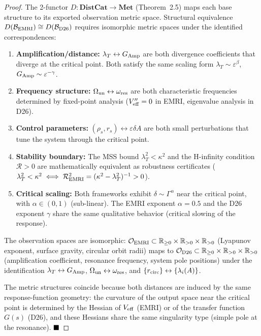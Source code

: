 \begin{proof}
The 2-functor $D: \mathbf{DistCat} \to \mathbf{Met}$ (Theorem~2.5) maps each base structure to its exported observation metric space. Structural equivalence $D(\mathcal{B}_{\rm EMRI}) \cong D(\mathcal{B}_{\rm D26})$ requires isomorphic metric spaces under the identified correspondences:
\begin{enumerate}
\item \textbf{Amplification/distance:} $\lambda_T \leftrightarrow G_{\rm Amp}$ are both divergence coefficients that diverge at the critical point. Both satisfy the same scaling form $\lambda_T \sim \varepsilon^\beta$, $G_{\rm Amp} \sim \varepsilon^{-\gamma}$.
\item \textbf{Frequency structure:} $\Omega_{\rm un} \leftrightarrow \omega_{\rm res}$ are both characteristic frequencies determined by fixed-point analysis ($V_{\rm eff}'' = 0$ in EMRI, eigenvalue analysis in D26).
\item \textbf{Control parameters:} $(\rho_s, r_s) \leftrightarrow \varepsilon\delta A$ are both small perturbations that tune the system through the critical point.
\item \textbf{Stability boundary:} The MSS bound $\lambda_T^2 < \kappa^2$ and the H-infinity condition $\mathcal{R} > 0$ are mathematically equivalent as robustness certificates ($\lambda_T^2 < \kappa^2 \iff \mathcal{R}_{\rm EMRI}^2 = (\kappa^2 - \lambda_T^2)^{-1} > 0$).
\item \textbf{Critical scaling:} Both frameworks exhibit $\delta \sim \Gamma^\alpha$ near the critical point, with $\alpha \in (0, 1)$ (sub-linear). The EMRI exponent $\alpha = 0.5$ and the D26 exponent $\gamma$ share the same qualitative behavior (critical slowing of the response).
\end{enumerate}

The observation spaces are isomorphic: $\mathcal{O}_{\rm EMRI} \subset \mathbb{R}_{\geq 0} \times \mathbb{R}_{>0} \times \mathbb{R}_{>0}$ (Lyapunov exponent, surface gravity, circular orbit radii) maps to $\mathcal{O}_{\rm D26} \subset \mathbb{R}_{\geq 0} \times \mathbb{R}_{>0} \times \mathbb{R}_{>0}$ (amplification coefficient, resonance frequency, system pole positions) under the identification $\lambda_T \leftrightarrow G_{\rm Amp}$, $\Omega_{\rm un} \leftrightarrow \omega_{\rm res}$, and $\{r_{\rm circ}\} \leftrightarrow \{\lambda_i(A)\}$.

The metric structures coincide because both distances are induced by the same response-function geometry: the curvature of the output space near the critical point is determined by the Hessian of $V_{\rm eff}$ (EMRI) or of the transfer function $G(s)$ (D26), and these Hessians share the same singularity type (simple pole at the resonance). $\hfill\blacksquare$
\end{proof}

